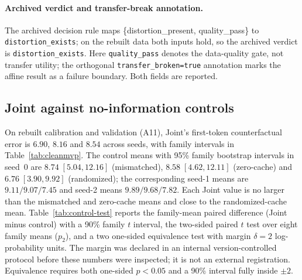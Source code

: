 \documentclass[11pt,twocolumn]{article}
\begin{document}
\paragraph{Archived verdict and transfer-break annotation.} The archived
decision rule maps \{distortion\_present, quality\_pass\} to
\texttt{distortion\_exists}; on the rebuilt data both inputs hold, so the
archived verdict is \texttt{distortion\_exists}. Here \texttt{quality\_pass}
denotes the data-quality gate, not transfer utility; the orthogonal
\texttt{transfer\_broken=true} annotation marks the affine result as a failure
boundary. Both fields are reported.

\subsection{Joint against no-information controls}
\label{sec:controltest}

On rebuilt calibration and validation (A11), Joint's first-token counterfactual
error is $6.90$, $8.16$ and $8.54$ across seeds, with family intervals in
Table~\ref{tab:cleanmvp}. The control means with 95\% family bootstrap intervals
in seed~0 are $8.74\;[5.04,12.16]$ (mismatched), $8.58\;[4.62,12.11]$
(zero-cache) and $6.76\;[3.90,9.92]$ (randomized); the corresponding seed-1
means are $9.11/9.07/7.45$ and seed-2 means $9.89/9.68/7.82$. Each Joint value
is no larger than the mismatched and zero-cache means and close to the
randomized-cache mean. Table~\ref{tab:control-test}
reports the family-mean paired difference (Joint minus control) with a 90\%
family $t$ interval, the two-sided paired $t$ test over eight family means
($p_2$), and a two one-sided equivalence test with margin $\delta=2$
log-probability units. The margin was declared in an internal version-controlled
protocol before these numbers were inspected; it is not an external
registration. Equivalence requires both one-sided $p<0.05$ and a 90\% interval
fully inside $\pm2$.
\end{document}
